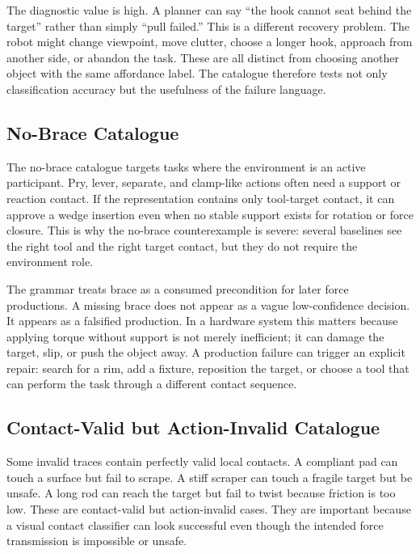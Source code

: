 \documentclass{article}
\begin{document}
The diagnostic value is high. A planner can say ``the hook cannot seat behind the target'' rather than simply ``pull failed.'' This is a different recovery problem. The robot might change viewpoint, move clutter, choose a longer hook, approach from another side, or abandon the task. These are all distinct from choosing another object with the same affordance label. The catalogue therefore tests not only classification accuracy but the usefulness of the failure language.

\subsection{No-Brace Catalogue}

The no-brace catalogue targets tasks where the environment is an active participant. Pry, lever, separate, and clamp-like actions often need a support or reaction contact. If the representation contains only tool-target contact, it can approve a wedge insertion even when no stable support exists for rotation or force closure. This is why the no-brace counterexample is severe: several baselines see the right tool and the right target contact, but they do not require the environment role.

The grammar treats brace as a consumed precondition for later force productions. A missing brace does not appear as a vague low-confidence decision. It appears as a falsified production. In a hardware system this matters because applying torque without support is not merely inefficient; it can damage the target, slip, or push the object away. A production failure can trigger an explicit repair: search for a rim, add a fixture, reposition the target, or choose a tool that can perform the task through a different contact sequence.

\subsection{Contact-Valid but Action-Invalid Catalogue}

Some invalid traces contain perfectly valid local contacts. A compliant pad can touch a surface but fail to scrape. A stiff scraper can touch a fragile target but be unsafe. A long rod can reach the target but fail to twist because friction is too low. These are contact-valid but action-invalid cases. They are important because a visual contact classifier can look successful even though the intended force transmission is impossible or unsafe.
\end{document}
